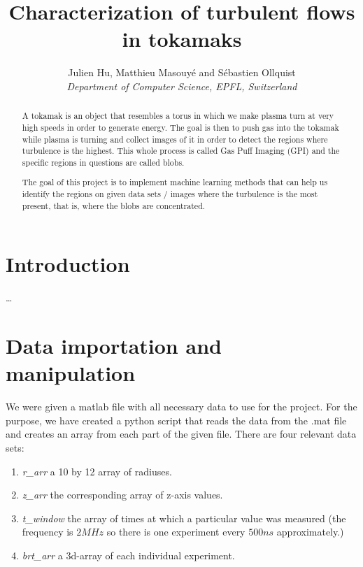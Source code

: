 \documentclass[10pt,conference,compsocconf]{IEEEtran}
\begin{document}
\title{Characterization of turbulent flows in tokamaks}

\author{
  Julien Hu, Matthieu Masouyé and Sébastien Ollquist\\
  \textit{Department of Computer Science, EPFL, Switzerland}
}

\maketitle

\begin{abstract}
  A tokamak is an object that resembles a torus in which we make plasma turn at very high speeds in order to generate energy. The goal is then to push gas into the tokamak while plasma is turning and collect images of it in order to detect the regions where turbulence is the highest. This whole process is called Gas Puff Imaging (GPI) and the specific regions in questions are called blobs.\par
  The goal of this project is to implement machine learning methods that can help us identify the regions on given data sets / images where the turbulence is the most present, that is, where the blobs are concentrated.
\end{abstract}

\section{Introduction}
\dots
\section{Data importation and manipulation}
We were given a matlab file with all necessary data to use for the project. For the purpose, we have created a python script that reads the data from the .mat file and creates an array from each part of the given file. There are four relevant data sets:
\begin{enumerate}
  \item \textit{r\_arr} a 10 by 12 array of radiuses.
  \item \textit{z\_arr} the corresponding array of z-axis values.
  \item \textit{t\_window} the array of times at which a particular value was measured (the frequency is $2MHz$ so there is one experiment every $500ns$ approximately.)
  \item \textit{brt\_arr} a 3d-array of each individual experiment.
\end{enumerate}



\end{document}
